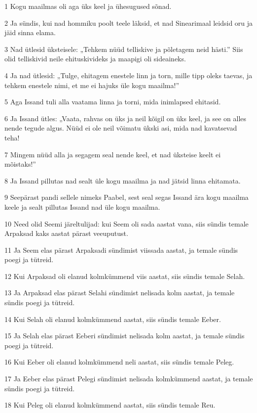 \par 1 Kogu maailmas oli aga üks keel ja ühesugused sõnad.
\par 2 Ja sündis, kui nad hommiku poolt teele läksid, et nad Sinearimaal leidsid oru ja jäid sinna elama.
\par 3 Nad ütlesid üksteisele: „Tehkem nüüd telliskive ja põletagem neid hästi.” Siis olid telliskivid neile ehituskivideks ja maapigi oli sideaineks.
\par 4 Ja nad ütlesid: „Tulge, ehitagem enestele linn ja torn, mille tipp oleks taevas, ja tehkem enestele nimi, et me ei hajuks üle kogu maailma!”
\par 5 Aga Issand tuli alla vaatama linna ja torni, mida inimlapsed ehitasid.
\par 6 Ja Issand ütles: „Vaata, rahvas on üks ja neil kõigil on üks keel, ja see on alles nende tegude algus. Nüüd ei ole neil võimatu ükski asi, mida nad kavatsevad teha!
\par 7 Mingem nüüd alla ja segagem seal nende keel, et nad üksteise keelt ei mõistaks!”
\par 8 Ja Issand pillutas nad sealt üle kogu maailma ja nad jätsid linna ehitamata.
\par 9 Seepärast pandi sellele nimeks Paabel, sest seal segas Issand ära kogu maailma keele ja sealt pillutas Issand nad üle kogu maailma.
\par 10 Need olid Seemi järeltulijad: kui Seem oli sada aastat vana, siis sündis temale Arpaksad kaks aastat pärast veeuputust.
\par 11 Ja Seem elas pärast Arpaksadi sündimist viissada aastat, ja temale sündis poegi ja tütreid.
\par 12 Kui Arpaksad oli elanud kolmkümmend viis aastat, siis sündis temale Selah.
\par 13 Ja Arpaksad elas pärast Selahi sündimist nelisada kolm aastat, ja temale sündis poegi ja tütreid.
\par 14 Kui Selah oli elanud kolmkümmend aastat, siis sündis temale Eeber.
\par 15 Ja Selah elas pärast Eeberi sündimist nelisada kolm aastat, ja temale sündis poegi ja tütreid.
\par 16 Kui Eeber oli elanud kolmkümmend neli aastat, siis sündis temale Peleg.
\par 17 Ja Eeber elas pärast Pelegi sündimist nelisada kolmkümmend aastat, ja temale sündis poegi ja tütreid.
\par 18 Kui Peleg oli elanud kolmkümmend aastat, siis sündis temale Reu.
